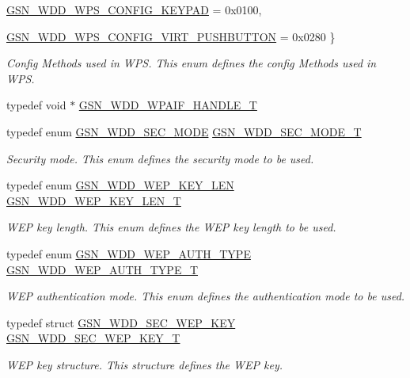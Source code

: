 \begin{DoxyCompactItemize}
\par
\hyperlink{a00604_aaf56a679ef5989460c2d2bad97d4c353a01795f1b0ebe3c7bbc2b79b378432472}{GSN\_\-WDD\_\-WPS\_\-CONFIG\_\-KEYPAD} =  0x0100, 
\par
\hyperlink{a00604_aaf56a679ef5989460c2d2bad97d4c353a820ca1ca950bddb2407e6fcde41fc5b0}{GSN\_\-WDD\_\-WPS\_\-CONFIG\_\-VIRT\_\-PUSHBUTTON} =  0x0280
 \}
\begin{DoxyCompactList}\small\item\em Config Methods used in WPS. This enum defines the config Methods used in WPS. \end{DoxyCompactList}\item 
typedef void $\ast$ \hyperlink{a00604_abe0c512b373bf02e6fb6185079cb6f0c}{GSN\_\-WDD\_\-WPAIF\_\-HANDLE\_\-T}
\item 
typedef enum \hyperlink{a00604_a1bc8fa529d709c2a8a87aee6038fb7ec}{GSN\_\-WDD\_\-SEC\_\-MODE} \hyperlink{a00604_a99d01b68f744000378664161f66e73c9}{GSN\_\-WDD\_\-SEC\_\-MODE\_\-T}
\begin{DoxyCompactList}\small\item\em Security mode. This enum defines the security mode to be used. \end{DoxyCompactList}\item 
typedef enum \hyperlink{a00604_a2f5e27be6ba83f628dd6ee8f2becf7ba}{GSN\_\-WDD\_\-WEP\_\-KEY\_\-LEN} \hyperlink{a00604_a8c3a847d44b6c5df18ed812cf0efca62}{GSN\_\-WDD\_\-WEP\_\-KEY\_\-LEN\_\-T}
\begin{DoxyCompactList}\small\item\em WEP key length. This enum defines the WEP key length to be used. \end{DoxyCompactList}\item 
typedef enum \hyperlink{a00604_a4e509d9d0746f0bdbd70053f516ce369}{GSN\_\-WDD\_\-WEP\_\-AUTH\_\-TYPE} \hyperlink{a00604_a6ac85e9527841d5a5c60fcd76a0c5100}{GSN\_\-WDD\_\-WEP\_\-AUTH\_\-TYPE\_\-T}
\begin{DoxyCompactList}\small\item\em WEP authentication mode. This enum defines the authentication mode to be used. \end{DoxyCompactList}\item 
typedef struct \hyperlink{a00295}{GSN\_\-WDD\_\-SEC\_\-WEP\_\-KEY} \hyperlink{a00604_ad403eea763b418200b48fca5debb58bd}{GSN\_\-WDD\_\-SEC\_\-WEP\_\-KEY\_\-T}
\begin{DoxyCompactList}\small\item\em WEP key structure. This structure defines the WEP key. \end{DoxyCompactList}\item 

\end{DoxyCompactItemize}
